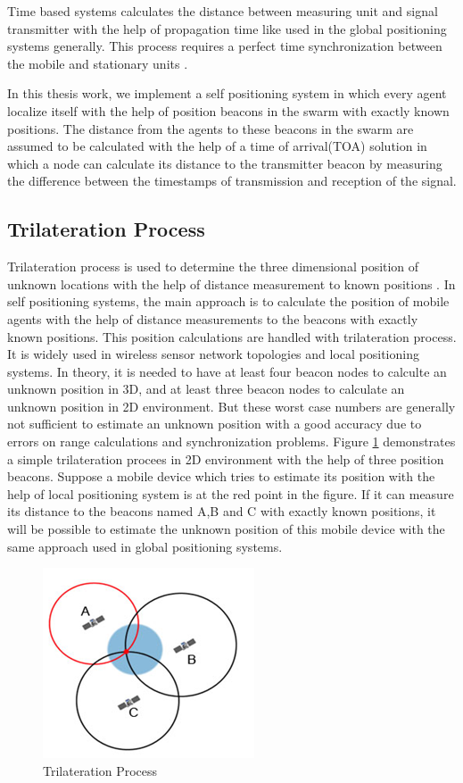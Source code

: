 Time based systems calculates the distance between measuring unit and signal transmitter with the help of propagation time like used in the global positioning systems generally. This process requires a perfect time synchronization between the mobile and stationary units \cite{20}.

In this thesis work, we implement a self positioning system in which every agent localize itself with the help of position beacons in the swarm with exactly known positions. The distance from the agents to these beacons in the swarm are assumed to be calculated with the help of a time of arrival(TOA) solution in which a node can calculate its distance to the transmitter beacon by measuring the difference between the timestamps of transmission and reception of the signal. 


\subsection{Trilateration Process} \label{Trilateration_Process_ref}

Trilateration process is used to determine the three dimensional position of unknown locations with the help of distance measurement to known positions \cite{22}. In self positioning systems, the main approach is to calculate the position of mobile agents with the help of distance measurements to the beacons with exactly known positions. This position calculations are handled with trilateration process. It is widely used in wireless sensor network topologies and local positioning systems.  In theory, it is needed to have at least four beacon nodes to calculte an unknown position in 3D, and at least three beacon nodes to calculate an unknown position in 2D environment. But these worst case numbers are generally not sufficient to estimate an unknown position with a good accuracy due to errors on range calculations and synchronization problems. Figure \ref{trilateration_ref} demonstrates a simple trilateration procees in 2D environment with the help of  three position beacons. Suppose a mobile device which tries to estimate its position with the help of local positioning system is at the red point in the figure. If it can measure its distance to the beacons named A,B and C with exactly known positions, it will be possible to estimate the unknown position of this mobile device with the same approach used in global positioning systems. 


\begin{figure}[H]
	\caption{Trilateration Process \cite{101}} \label{trilateration_ref}
	\centering
	\includegraphics[scale = 1]{trilateration}
\end{figure}

